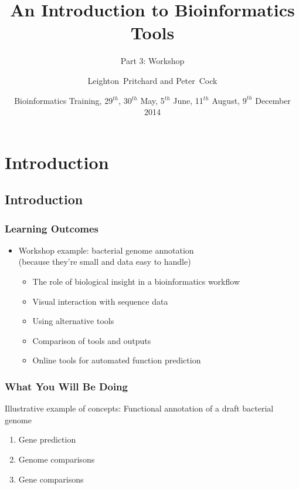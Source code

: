 


\title[Intro to Bioinformatics] %
{An Introduction to Bioinformatics Tools}
\subtitle{Part 3: Workshop}
\author[Pritchard, Cock] %
{Leighton~Pritchard and Peter~Cock}
\date[May, June, August, December 2014] %
{Bioinformatics Training, 29$^{th}$, 30$^{th}$ May, 5$^{th}$ June, 11$^{th}$ August, $9^{th}$ December 2014}
\subject{Bioinformatics}





\frame[plain]{\titlepage}
 
\section{Introduction}
\subsection{Introduction}
\begin{frame}
  \frametitle{Learning Outcomes}
  \begin{itemize}
    \item Workshop example: bacterial genome annotation \\
             (because they're small and data easy to handle)
    \begin{itemize}
      \item The role of biological insight in a bioinformatics workflow
      \item Visual interaction with sequence data
      \item Using alternative tools
      \item Comparison of tools and outputs
      \item Online tools for automated function prediction
    \end{itemize}
  \end{itemize}
\end{frame} 
  
\begin{frame}
  \frametitle{What You Will Be Doing}
  Illustrative example of concepts: Functional annotation of a draft bacterial genome
  \begin{enumerate}
    \item Gene prediction
    \item Genome comparisons
    \item Gene comparisons
  \end{enumerate}
\end{frame}

